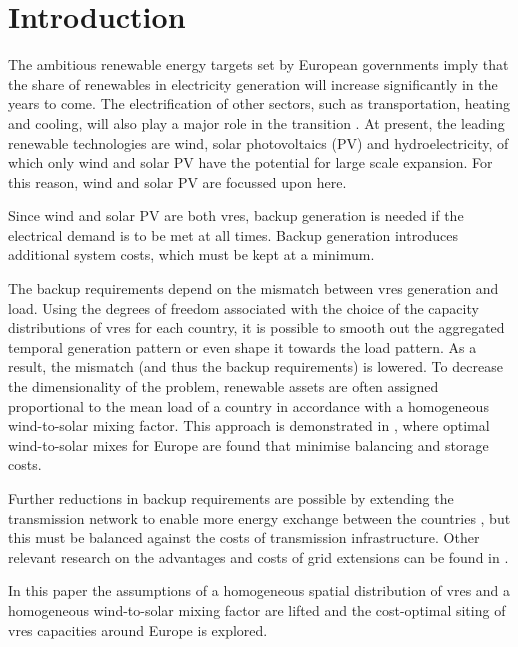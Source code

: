 \documentclass[a4paper, 5p, sort&compress]{elsarticle}%
\begin{document}
\section{Introduction}
\label{sec:one}

The ambitious renewable energy targets set by European governments
\cite{eu2050} imply that the share of renewables in electricity
generation will increase significantly in the years to come.  The
electrification of other sectors, such as transportation, heating and
cooling, will also play a major role in the transition
\cite{Williams12,ecf2050}. At present, the leading renewable
technologies are wind, solar photovoltaics (PV) and hydroelectricity,
of which only wind and solar PV have the potential for large scale
expansion. For this reason, wind and solar PV
are focussed upon here.

Since wind and solar PV are both \gls{vres}, backup generation is needed if the electrical demand is to be met at all times. Backup
generation introduces additional system costs, which must be kept at a minimum.

The backup requirements depend on the mismatch between \gls{vres} generation and load. Using
the degrees of freedom associated with the choice of the capacity distributions of \gls{vres} for each country, it is
possible to smooth out the aggregated temporal generation pattern or even shape it towards the
load pattern. As a result, the mismatch (and thus the backup requirements) is lowered.  To
decrease the dimensionality of the problem, renewable assets are often assigned proportional to
the mean load of a country in accordance with a homogeneous wind-to-solar mixing factor. This
approach is demonstrated in \cite{Heide2010,Heide2011}, where optimal wind-to-solar mixes for
Europe are found that minimise balancing and storage costs.

Further reductions in backup requirements are possible by extending
the transmission network to enable more energy exchange between the
countries \cite{rolando2014,sarah}, but this must be balanced against the costs of transmission infrastructure. Other relevant research on the
advantages and costs of grid extensions can be found in
\cite{Papae,Schaber,Schaber2,Egerer,Brown}.


In this paper the assumptions of a homogeneous spatial distribution of
\gls{vres} and a homogeneous wind-to-solar mixing factor are lifted and the
cost-optimal siting of \gls{vres} capacities around Europe is explored.
\end{document}
